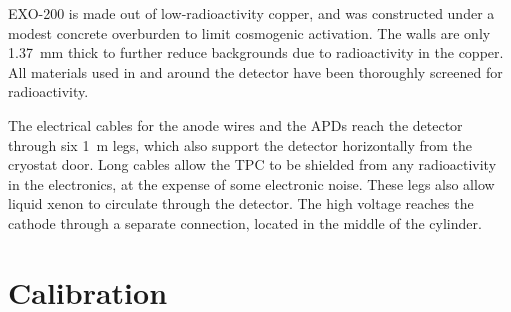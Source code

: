 \documentclass[herrin-thesis.tex]{subfiles}
\begin{document}
EXO-200 is made out of low-radioactivity copper, and was constructed under a modest concrete overburden to limit cosmogenic activation. The walls are only \SI{1.37}{\mm} thick to further reduce backgrounds due to radioactivity in the copper. All materials used in and around the detector have been thoroughly screened for radioactivity\cite{Leonard:2008uq}.

The electrical cables for the anode wires and the APDs reach the detector through six \about{}\SI{1}{\m} legs, which also support the detector horizontally from the cryostat door. Long cables allow the TPC to be shielded from any radioactivity in the electronics, at the expense of some electronic noise. These legs also allow liquid xenon to circulate through the detector. The high voltage reaches the cathode through a separate connection, located in the middle of the cylinder.

\section{Calibration}
\label{sec:detector_calibration}
\end{document}
